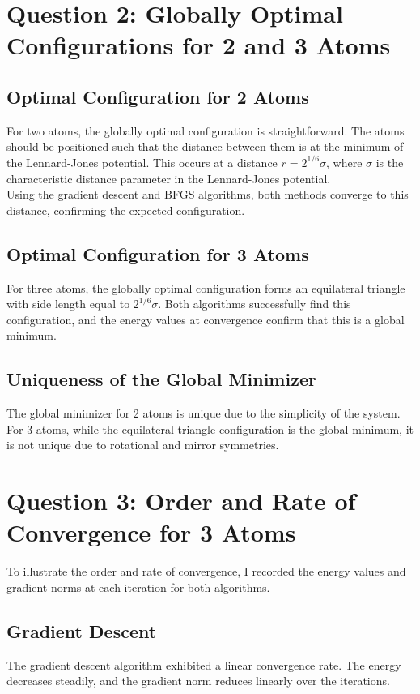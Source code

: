 \documentclass[11pt,onecolumn]{article}
\begin{document}
\section*{Question 2: Globally Optimal Configurations for 2 and 3 Atoms}
\subsection*{Optimal Configuration for 2 Atoms}
For two atoms, the globally optimal configuration is straightforward. The atoms should be positioned such that the distance between them is at the minimum of the Lennard-Jones potential. This occurs at a distance \( r = 2^{1/6} \sigma \), where \( \sigma \) is the characteristic distance parameter in the Lennard-Jones potential.
\\
Using the gradient descent and BFGS algorithms, both methods converge to this distance, confirming the expected configuration.

\subsection*{Optimal Configuration for 3 Atoms}
For three atoms, the globally optimal configuration forms an equilateral triangle with side length equal to \( 2^{1/6} \sigma \). Both algorithms successfully find this configuration, and the energy values at convergence confirm that this is a global minimum.

\subsection*{Uniqueness of the Global Minimizer}
The global minimizer for 2 atoms is unique due to the simplicity of the system. For 3 atoms, while the equilateral triangle configuration is the global minimum, it is not unique due to rotational and mirror symmetries.

\section*{Question 3: Order and Rate of Convergence for 3 Atoms}

To illustrate the order and rate of convergence, I recorded the energy values and gradient norms at each iteration for both algorithms.

\subsection*{Gradient Descent}
The gradient descent algorithm exhibited a linear convergence rate. The energy decreases steadily, and the gradient norm reduces linearly over the iterations.
\end{document}
